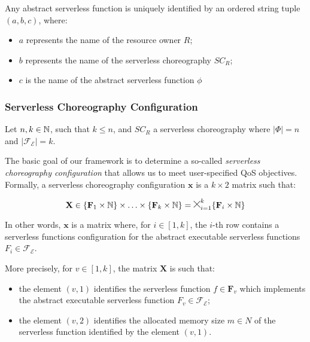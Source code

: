 Any abstract serverless function is uniquely identified by an ordered string tuple $(a, b, c)$, where:
\begin{itemize}
	\item $a$ represents the name of the resource owner $R$;
	\item $b$ represents the name of the serverless choreography $SC_R$;
	\item $c$ is the name of the abstract serverless function $\phi$
\end{itemize}

\subsubsection{Serverless Choreography Configuration}

Let $n,k \in \mathbb{N}$, such that $k \leq n$, and $SC_R$ a serverless choreography where $|\Phi| = n$ and $|\mathscr{F_E}| = k$. 

The basic goal of our framework is to determine a so-called \textit{serverless choreography configuration} that allows us to meet user-specified QoS objectives. Formally, a serverless choreography configuration $\textbf{x}$ is a $k\times2$ matrix such that:

\begin{equation}
\textbf{X} \in \lbrace \textbf{F}_1 \times \mathbb{N} \rbrace \times \ldots \times \lbrace \textbf{F}_k \times \mathbb{N} \rbrace = \Cross_{i = 1}^k \lbrace \textbf{F}_i \times \mathbb{N} \rbrace
\end{equation}

In other words, $\textbf{x}$ is a matrix where, for $i \in \left[ 1, k \right]$, the $i$-th row contains a serverless functions configuration for the abstract executable serverless functions $F_i \in \mathscr{F_E}$. 

More precisely, for $v \in \left[ 1, k \right]$, the matrix $\textbf{X}$ is such that:

\begin{itemize}
	\item the element $(v,1)$ identifies the serverless function $f \in \textbf{F}_v$ which implements the abstract executable serverless function $F_v \in \mathscr{F_E}$;
	
	\item the element $(v,2)$ identifies the allocated memory size $m \in N$ of the serverless function identified by the element $(v,1)$.
\end{itemize}

